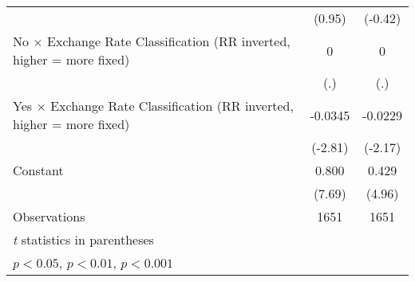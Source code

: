 {\begin{tabular*}{\linewidth}{@{\hskip\tabcolsep\extracolsep\fill}l*{2}{c}}
                &   (0.95)         &  (-0.42)         \\
\addlinespace
No $\times$ Exchange Rate Classification (RR inverted, higher = more fixed)&        0         &        0         \\
                &      (.)         &      (.)         \\
\addlinespace
Yes $\times$ Exchange Rate Classification (RR inverted, higher = more fixed)&  -0.0345\sym{**} &  -0.0229\sym{*}  \\
                &  (-2.81)         &  (-2.17)         \\
\addlinespace
Constant        &    0.800\sym{***}&    0.429\sym{***}\\
                &   (7.69)         &   (4.96)         \\
\midrule
Observations    &     1651         &     1651         \\
\bottomrule
\multicolumn{3}{l}{\footnotesize \textit{t} statistics in parentheses}\\
\multicolumn{3}{l}{\footnotesize \sym{*} \(p<0.05\), \sym{**} \(p<0.01\), \sym{***} \(p<0.001\)}\\
\end{tabular*}
}
